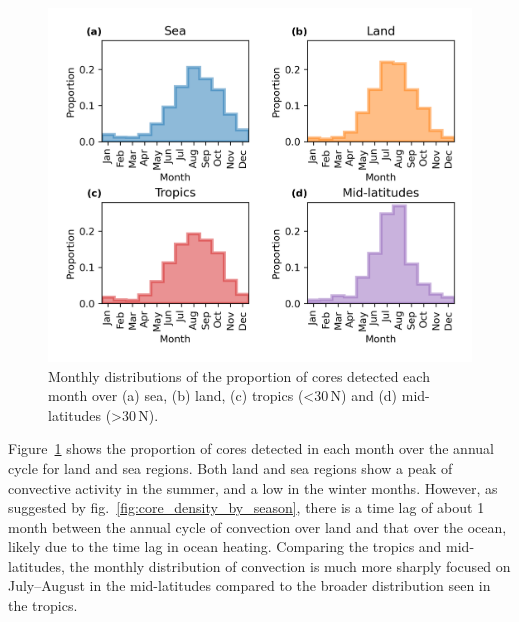 \begin{figure}[tp]
    \centering
    \includegraphics[width=\textwidth]{figures/chapter2_04.png}
    \caption[
    Monthly distributions of the proportion of cores detected each month over land, sea, tropics and mid-latitudes
    ]{
    Monthly distributions of the proportion of cores detected each month over (a) sea, (b) land, (c) tropics (\textless 30\,\textdegree N) and (d) mid-latitudes (\textgreater 30\,\textdegree N).
    }
    \label{fig:core_annual_land_sea}
\end{figure}


Figure~\ref{fig:core_annual_land_sea} shows the proportion of cores detected in each month over the annual cycle for land and sea regions.
Both land and sea regions show a peak of convective activity in the summer, and a low in the winter months.
However, as suggested by fig.~\ref{fig:core_density_by_season}, there is a time lag of about 1 month between the annual cycle of convection over land and that over the ocean, likely due to the time lag in ocean heating.
Comparing the tropics and mid-latitudes, the monthly distribution of convection is much more sharply focused on July--August in the mid-latitudes compared to the broader distribution seen in the tropics.


